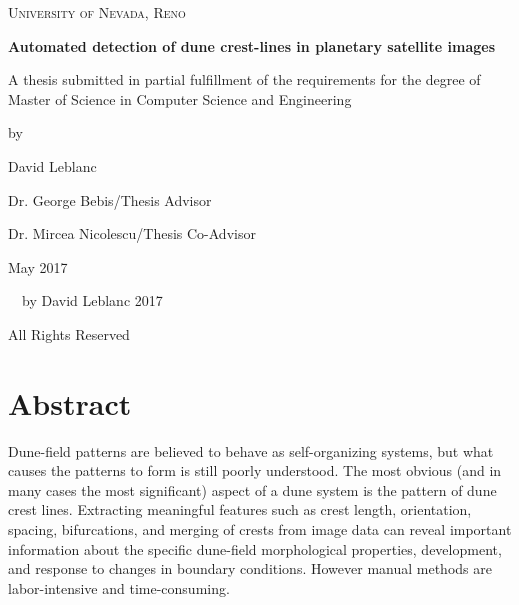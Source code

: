 \documentclass[11pt]{article}
\begin{document}
\begin{titlepage}
	\centering
	{\scshape\LARGE University of Nevada, Reno \par}
	\vspace{2.5cm}
	{\Large\bfseries Automated detection of dune crest-lines in planetary satellite images\par}
	\vspace{2.5cm}
	{\large A thesis submitted in partial fulfillment of the requirements for the degree of Master of Science in Computer Science and Engineering\par}
	\vspace{1.5cm}	
	{\Large by\par}
	{\Large David Leblanc\par}
	\vfill
	{\large Dr. George Bebis/Thesis Advisor
		 
		Dr. Mircea Nicolescu/Thesis Co-Advisor}
	\vfill
	{\large May 2017\par}
\end{titlepage}

\begin{center}
\vspace*{\fill}
{~\textcopyright~by David Leblanc 2017 \par}
{All Rights Reserved}
\vspace*{\fill}
\end{center}

\newpage

%

\section*{Abstract}

Dune-field patterns are believed to behave as self-organizing systems, but what causes the patterns to form is still poorly understood. The most obvious (and in many cases the most significant) aspect of a dune system is the pattern of dune crest lines. Extracting meaningful features such as crest length, orientation, spacing, bifurcations, and merging of crests from image data can reveal important information about the specific dune-field morphological properties, development, and response to changes in boundary conditions. However manual methods are labor-intensive and time-consuming. 
\end{document}
